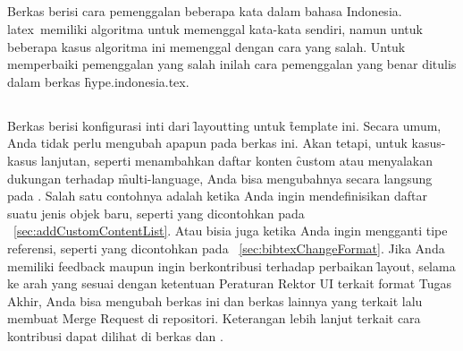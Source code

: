 \subsection{}
\label{sec:hype-indonesia-tex}
Berkas  berisi cara pemenggalan beberapa kata dalam bahasa Indonesia.
\gls{latex}~memiliki algoritma untuk memenggal kata-kata sendiri, namun untuk beberapa kasus algoritma ini memenggal dengan cara yang salah.
Untuk memperbaiki pemenggalan yang salah inilah cara pemenggalan yang benar ditulis dalam berkas \f{hype.indonesia.tex}.

\subsection{}
\label{sec:uithesis.sty}
Berkas  berisi konfigurasi inti dari \f{layoutting} untuk \f{template} ini.
Secara umum, Anda tidak perlu mengubah apapun pada berkas ini.
Akan tetapi, untuk kasus-kasus lanjutan, seperti menambahkan daftar konten \f{custom} atau menyalakan dukungan terhadap \f{multi-language}, Anda bisa mengubahnya secara langsung pada .
Salah satu contohnya adalah ketika Anda ingin mendefinisikan daftar suatu jenis objek baru, seperti yang dicontohkan pada \sect~\ref{sec:addCustomContentList}.
Atau bisia juga ketika Anda ingin mengganti tipe referensi, seperti yang dicontohkan pada \sect~\ref{sec:bibtexChangeFormat}.
Jika Anda memiliki feedback maupun ingin berkontribusi terhadap perbaikan \f{layout}, selama ke arah yang sesuai dengan ketentuan Peraturan Rektor UI terkait format Tugas Akhir, Anda bisa mengubah berkas ini dan berkas lainnya yang terkait lalu membuat Merge Request di repositori.
Keterangan lebih lanjut terkait cara kontribusi dapat dilihat di berkas  dan .


